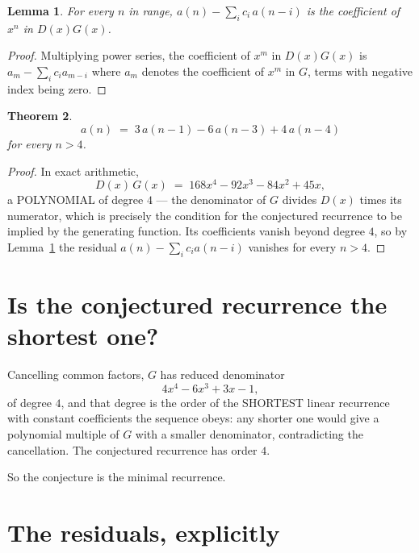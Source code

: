 \documentclass[11pt,a4paper]{article}
\theoremstyle{plain}
\newtheorem{theorem}{Theorem}
\newtheorem{lemma}[theorem]{Lemma}
\theoremstyle{definition}
\begin{document}
\begin{lemma}\label{lem:key}
For every $n$ in range, $a(n)-\sum_i c_i\,a(n-i)$ is the coefficient of $x^{n}$ in
$D(x)G(x)$.
\end{lemma}

\begin{proof}
Multiplying power series, the coefficient of $x^{m}$ in $D(x)G(x)$ is
$a_m-\sum_i c_i a_{m-i}$ where $a_m$ denotes the coefficient of $x^{m}$ in $G$, terms with
negative index being zero.
\end{proof}

\begin{theorem}
\[
a(n)\;=\;3\,a(n-1) - 6\,a(n-3) + 4\,a(n-4)
\]
for every $n>4$.
\end{theorem}

\begin{proof}
In exact arithmetic,
\[
D(x)\,G(x)\;=\;168 x^{4} - 92 x^{3} - 84 x^{2} + 45 x,
\]
a POLYNOMIAL of degree $4$ --- the denominator of $G$ divides $D(x)$ times its numerator,
which is precisely the condition for the conjectured recurrence to be implied by the
generating function. Its coefficients vanish beyond degree $4$, so by
Lemma~\ref{lem:key} the residual $a(n)-\sum_ic_ia(n-i)$ vanishes for every
$n>4$.
\end{proof}

\section{Is the conjectured recurrence the shortest one?}

Cancelling common factors, $G$ has reduced denominator
\[
4 x^{4} - 6 x^{3} + 3 x - 1,
\]
of degree $4$, and that degree is the order of the SHORTEST linear recurrence with
constant coefficients the sequence obeys: any shorter one would give a polynomial multiple of
$G$ with a smaller denominator, contradicting the cancellation. The conjectured recurrence has
order $4$.

So the conjecture is the minimal recurrence.

\section{The residuals, explicitly}
\end{document}
